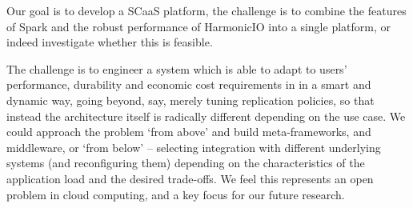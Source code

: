\documentclass[letterpaper,conference]{IEEEtran}
\begin{document}

Our goal is to develop a SCaaS platform, %
the challenge is to combine the features of Spark and the robust performance of HarmonicIO into a single platform, or indeed investigate whether this is feasible. 


The challenge is to engineer a system which is able to adapt to users' performance, durability and economic cost requirements in in a smart and dynamic way, going beyond, say, merely tuning replication policies, so that instead the architecture itself is radically different depending on the use case. We could approach the problem `from above' and build meta-frameworks, and middleware,
or `from below' -- selecting integration with different underlying systems (and reconfiguring them) depending on the characteristics of the application load and the desired trade-offs. %
We feel this represents an open problem in cloud computing, and a key focus for our future research.






% 
% 


{
}
\end{document}
